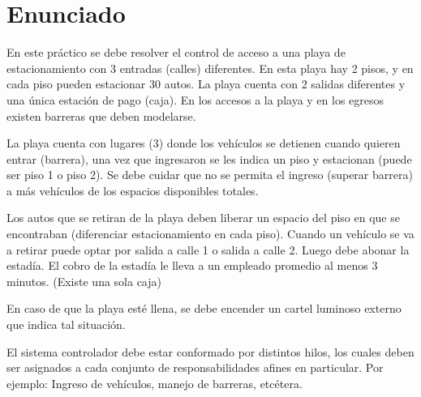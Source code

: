 \documentclass[12pt,a4paper]{article}
\begin{document}
\section{Enunciado}
\label{enunciado}

En este práctico se debe resolver el control de acceso a una playa de estacionamiento con 3 entradas (calles) diferentes. En esta playa hay 2 pisos, y en cada piso pueden estacionar 30 autos. La playa cuenta con 2 salidas diferentes y una única estación de pago (caja). En los accesos a la playa y en los egresos existen barreras que deben modelarse.

La playa cuenta con lugares (3) donde los vehículos se detienen cuando quieren entrar (barrera), una vez que ingresaron se les indica un piso y estacionan (puede ser piso 1 o piso 2). Se debe cuidar que no se permita el ingreso (superar barrera) a más vehículos de los espacios disponibles totales.

Los autos que se retiran de la playa deben liberar un espacio del piso en que se encontraban (diferenciar estacionamiento en cada piso). Cuando un vehículo se va a retirar puede optar por salida a calle 1 o salida a calle 2.
Luego debe abonar la estadía. El cobro de la estadía le lleva a un empleado promedio al menos 3 minutos. (Existe una sola caja)

En caso de que la playa esté llena, se debe encender un cartel luminoso externo que indica tal situación.

El sistema controlador debe estar conformado por distintos hilos, los cuales deben ser asignados a cada conjunto de responsabilidades afines en particular. Por ejemplo: Ingreso de vehículos, manejo de barreras, etcétera.
\end{document}
